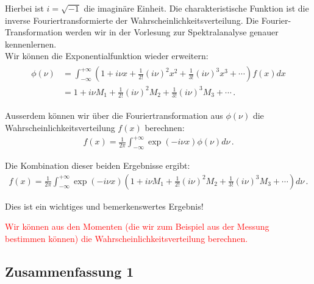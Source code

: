 Hierbei ist $i = \sqrt{ - 1 }$ die imagin\"are Einheit. Die charakteristische Funktion ist die inverse Fouriertransformierte der Wahrscheinlichkeitsverteilung. Die Fourier-Trans\-formation werden wir in der Vorlesung zur Spektralanalyse genauer kennenlernen.\\[0.3cm]
Wir k\"onnen die Exponentialfunktion wieder erweitern:
\begin{align}
\begin{split}
\phi ( \nu ) & = \int_{-\infty}^{+\infty} \left( 1 + i \nu x + \frac{ 1 }{ 2! } ( i \nu )^2 x^2 + \frac{ 1 }{ 3! } ( i \nu )^3 x^3 + \cdots \right) f ( x ) dx\\
& = 1 + i \nu M_1 + \frac{ 1 }{ 2 ! } ( i \nu )^2 M_2 + \frac{ 1 }{ 3! } ( i \nu )^3 M_3 + \cdots\,.
\end{split}
\label{eq:vl4-28}
\end{align}

Ausserdem k\"onnen wir \"uber die Fouriertransformation aus $\phi ( \nu )$ die Wahrscheinlichkeitsverteilung $f ( x )$ berechnen:
\begin{align}
f ( x ) = \frac{ 1 }{ 2 \pi } \int_{-\infty}^{+\infty} \exp ( -i \nu x ) \phi ( \nu ) d \nu\,.
\label{eq:vl4-29}
\end{align}

Die Kombination dieser beiden Ergebnisse ergibt:
\begin{align}
f ( x ) = \frac{ 1 }{ 2 \pi } \int_{-\infty}^{+\infty} \exp ( -i \nu x ) \left( 1 + i \nu M_1 + \frac{ 1 }{ 2 ! } ( i \nu )^2 M_2 + \frac{ 1 }{ 3! } ( i \nu )^3 M_3 + \cdots \right)  d \nu\,.
\label{eq:vl4-30}
\end{align}

Dies ist ein wichtiges und bemerkenswertes Ergebnis!

\begin{center}
\textcolor{red}{Wir k\"onnen aus den Momenten (die wir zum Beispiel aus der Messung bestimmen k\"onnen) die Wahrscheinlichkeitsverteilung berechnen.}
\end{center}


\subsection{Zusammenfassung 1}
\label{subsec:vl4-8}

